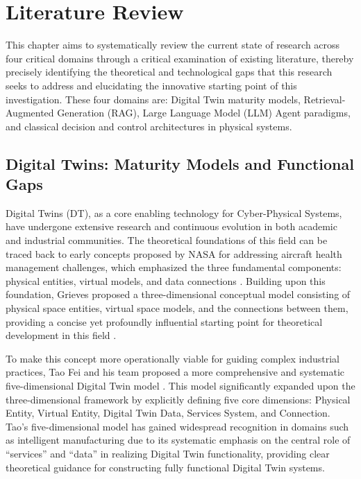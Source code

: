 
\chapter{Literature Review} \label{chp:literature}

This chapter aims to systematically review the current state of research across four critical domains through a critical examination of existing literature, thereby precisely identifying the theoretical and technological gaps that this research seeks to address and elucidating the innovative starting point of this investigation. These four domains are: Digital Twin maturity models, Retrieval-Augmented Generation (RAG), Large Language Model (LLM) Agent paradigms, and classical decision and control architectures in physical systems.

\section{Digital Twins: Maturity Models and Functional Gaps}

Digital Twins (DT), as a core enabling technology for Cyber-Physical Systems, have undergone extensive research and continuous evolution in both academic and industrial communities. The theoretical foundations of this field can be traced back to early concepts proposed by NASA for addressing aircraft health management challenges, which emphasized the three fundamental components: physical entities, virtual models, and data connections \cite{glaessgen2012digital}. Building upon this foundation, Grieves proposed a three-dimensional conceptual model consisting of physical space entities, virtual space models, and the connections between them, providing a concise yet profoundly influential starting point for theoretical development in this field \cite{grieves2014digital}.

To make this concept more operationally viable for guiding complex industrial practices, Tao Fei and his team proposed a more comprehensive and systematic five-dimensional Digital Twin model \cite{tao2018digital}. This model significantly expanded upon the three-dimensional framework by explicitly defining five core dimensions: Physical Entity, Virtual Entity, Digital Twin Data, Services System, and Connection. Tao's five-dimensional model has gained widespread recognition in domains such as intelligent manufacturing due to its systematic emphasis on the central role of ``services'' and ``data'' in realizing Digital Twin functionality, providing clear theoretical guidance for constructing fully functional Digital Twin systems.

